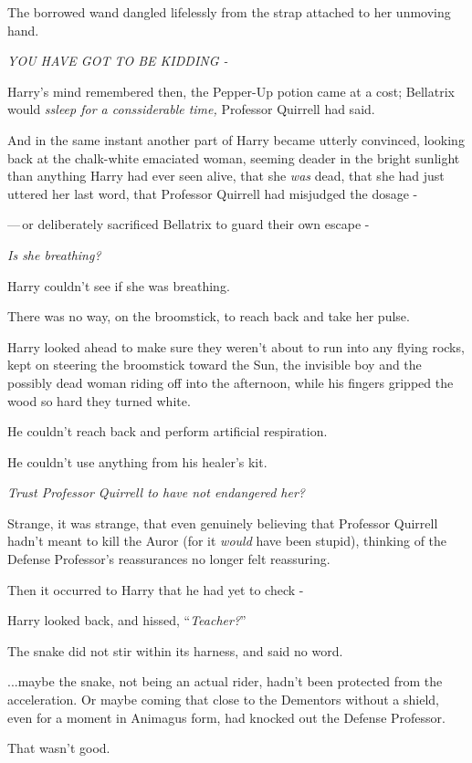 The borrowed wand dangled lifelessly from the strap attached to her unmoving hand.

\emph{YOU HAVE GOT TO BE KIDDING -}

Harry's mind remembered then, the Pepper-Up potion came at a cost; Bellatrix would \emph{ssleep for a conssiderable time,} Professor Quirrell had said.

And in the same instant another part of Harry became utterly convinced, looking back at the chalk-white emaciated woman, seeming deader in the bright sunlight than anything Harry had ever seen alive, that she \emph{was} dead, that she had just uttered her last word, that Professor Quirrell had misjudged the dosage -

---\,or deliberately sacrificed Bellatrix to guard their own escape -

\emph{Is she breathing?}

Harry couldn't see if she was breathing.

There was no way, on the broomstick, to reach back and take her pulse.

Harry looked ahead to make sure they weren't about to run into any flying rocks, kept on steering the broomstick toward the Sun, the invisible boy and the possibly dead woman riding off into the afternoon, while his fingers gripped the wood so hard they turned white.

He couldn't reach back and perform artificial respiration.

He couldn't use anything from his healer's kit.

\emph{Trust Professor Quirrell to have not endangered her?}

Strange, it was strange, that even genuinely believing that Professor Quirrell hadn't meant to kill the Auror (for it \emph{would} have been stupid), thinking of the Defense Professor's reassurances no longer felt reassuring.

Then it occurred to Harry that he had yet to check -

Harry looked back, and hissed, ``\emph{Teacher?}''

The snake did not stir within its harness, and said no word.

...maybe the snake, not being an actual rider, hadn't been protected from the acceleration. Or maybe coming that close to the Dementors without a shield, even for a moment in Animagus form, had knocked out the Defense Professor.

That wasn't good.


